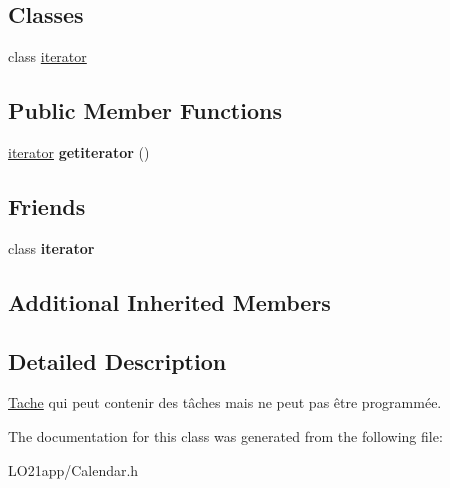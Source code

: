 \subsection*{Classes}
\begin{DoxyCompactItemize}
\item 
class \hyperlink{class_composite_1_1iterator}{iterator}
\end{DoxyCompactItemize}
\subsection*{Public Member Functions}
\begin{DoxyCompactItemize}
\item 
\hypertarget{class_composite_a63c52493ad8add53951157a418fa0971}{}\hyperlink{class_composite_1_1iterator}{iterator} {\bfseries getiterator} ()\label{class_composite_a63c52493ad8add53951157a418fa0971}

\end{DoxyCompactItemize}
\subsection*{Friends}
\begin{DoxyCompactItemize}
\item 
\hypertarget{class_composite_a67171474c4da6cc8efe0c7fafefd2b2d}{}class {\bfseries iterator}\label{class_composite_a67171474c4da6cc8efe0c7fafefd2b2d}

\end{DoxyCompactItemize}
\subsection*{Additional Inherited Members}


\subsection{Detailed Description}
\hyperlink{class_tache}{Tache} qui peut contenir des tâches mais ne peut pas être programmée. 

The documentation for this class was generated from the following file\+:\begin{DoxyCompactItemize}
\item 
L\+O21app/Calendar.\+h\end{DoxyCompactItemize}
